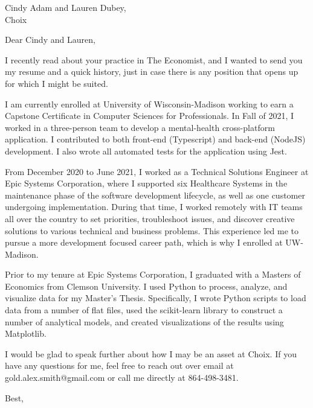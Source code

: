 \documentclass[a4paper, 10pt]{letter}
\begin{document}
	\begin{letter}
	{
	    Cindy Adam and Lauren Dubey,\\
	    Choix
	}

		    \opening{Dear Cindy and Lauren,}


		I recently read about your practice in The Economist, and I wanted to send you my resume and a quick history, just in case there is any position that opens up for which I might be suited.

		I am currently enrolled at University of Wisconsin-Madison working to earn a Capstone Certificate in Computer Sciences for Professionals. In Fall of 2021, I worked in a three-person team to develop a mental-health cross-platform application. I contributed to both front-end (Typescript) and back-end (NodeJS) development. I also wrote all automated tests for the application using Jest. 

		From December 2020 to June 2021, I worked as a Technical Solutions Engineer at Epic Systems Corporation, where I supported six Healthcare Systems in the maintenance phase of the software development lifecycle, as well as one customer undergoing implementation. During that time, I worked remotely with IT teams all over the country to set priorities, troubleshoot issues, and discover creative solutions to various technical and business problems. This experience led me to pursue a more development focused career path, which is why I enrolled at UW-Madison.

		Prior to my tenure at Epic Systems Corporation, I graduated with a Masters of Economics from Clemson University. I used Python to process, analyze, and visualize data for my Master’s Thesis. Specifically, I wrote Python scripts to load data from a number of flat files, used the scikit-learn library to construct a number of analytical models, and created visualizations of the results using Matplotlib.

		I would be glad to speak further about how I may be an asset at Choix. If you have any questions for me, feel free to reach out over email at gold.alex.smith@gmail.com or call me directly at 864-498-3481. 


		    \closing{Best,}

		    \end{letter}
		    
\end{document}

